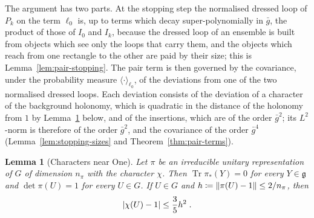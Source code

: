 \documentclass[11pt]{preprint}
\DeclarePairedDelimiter{\abs}{\lvert}{\rvert}
\DeclarePairedDelimiter{\norm}{\lVert}{\rVert}
\numberwithin{equation}{section}
\newtheorem{lemma}[theorem]{Lemma}
\theoremstyle{definition}
\theoremstyle{remark}
\theoremstyle{plain}
\begin{document}
The argument has two parts. At the stopping step the normalised dressed loop of $P_k$ on the term $\ell_0$ is, up to terms which decay super-polynomially in $\bar g$, the product of those of $I_0$ and $I_k$, because the dressed loop of an ensemble is built from objects which see only the loops that carry them, and the objects which reach from one rectangle to the other are paid by their size; this is Lemma~\ref{lem:pair-stopping}. The pair term is then governed by the covariance, under the probability measure $\langle\cdot\rangle_{\ell_0}$, of the deviations from one of the two normalised dressed loops. Each deviation consists of the deviation of a character of the background holonomy, which is quadratic in the distance of the holonomy from $1$ by Lemma~\ref{lem:near-one} below, and of the insertions, which are of the order $\bar g^2$; its $L^2$-norm is therefore of the order $\bar g^2$, and the covariance of the order $\bar g^4$ (Lemma~\ref{lem:stopping-sizes} and Theorem~\ref{thm:pair-terms}).

\begin{lemma}[Characters near One]\label{lem:near-one}
Let $\pi$ be an irreducible unitary representation of $G$ of dimension $n_\pi$ with the character $\chi$. Then $\operatorname{Tr}\pi_*(Y) = 0$ for every $Y \in \mathfrak g$ and $\det\pi(U) = 1$ for every $U \in G$. If $U \in G$ and $h \coloneqq \norm{\pi(U) - 1} \leq 2/n_\pi$, then
\begin{equation}\label{eq:near-one}
    \abs{\chi(U) - 1} \leq \frac35h^2\;.
\end{equation}
\end{lemma}
\end{document}
